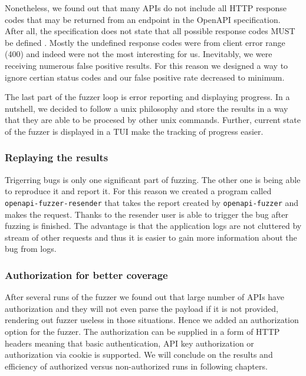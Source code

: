 Nonetheless, we found out that many APIs do not include all HTTP response codes that may be returned from an endpoint in the OpenAPI specification. After all, the specification does not state that all possible response codes MUST be defined \cite{openapi2020github}. Mostly the undefined response codes were from client error range (400) and indeed were not the most interesting for us. Inevitably, we were receiving numerous false positive results. For this reason we designed a way to ignore certian status codes and our false positive rate decreased to minimum.

The last part of the fuzzer loop is error reporting and displaying progress. In a nutshell, we decided to follow a unix philosophy and store the results in a way that they are able to be procesed by other unix commands. Further, current state of the fuzzer is displayed in a TUI make the tracking of progress easier.

\subsubsection{Replaying the results}
Trigerring bugs is only one significant part of fuzzing. The other one is being able to reproduce it and report it. For this reason we created a program called \newline \texttt{openapi-fuzzer-resender} that takes the report created by \texttt{openapi-fuzzer} and makes the request. Thanks to the resender user is able to trigger the bug after fuzzing is finished. The advantage is that the application logs are not cluttered by stream of other requests and thus it is easier to gain more information about the bug from logs.

\subsubsection{Authorization for better coverage}
After several runs of the fuzzer we found out that large number of APIs have authorization and they will not even parse the payload if it is not provided, rendering out fuzzer useless in those situations. Hence we added an authorization option for the fuzzer. The authorization can be supplied in a form of HTTP headers meaning that basic authentication, API key authorization or authorization via cookie is supported. We will conclude on the results and efficiency of authorized versus non-authorized runs in following chapters.
